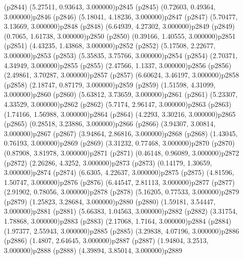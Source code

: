 \psdot(p2844)
\psPoint(5.27511, 0.93643, 3.000000){p2845}
\psdot(p2845)
\psPoint(0.72603, 0.49364, 3.000000){p2846}
\psdot(p2846)
\psPoint(5.18041, 4.18236, 3.000000){p2847}
\psdot(p2847)
\psPoint(5.70477, 3.13669, 3.000000){p2848}
\psdot(p2848)
\psPoint(6.64939, 4.27302, 3.000000){p2849}
\psdot(p2849)
\psPoint(0.7065, 1.61738, 3.000000){p2850}
\psdot(p2850)
\psPoint(0.39166, 1.40555, 3.000000){p2851}
\psdot(p2851)
\psPoint(4.43235, 1.43868, 3.000000){p2852}
\psdot(p2852)
\psPoint(5.17508, 2.22677, 3.000000){p2853}
\psdot(p2853)
\psPoint(5.35835, 3.75766, 3.000000){p2854}
\psdot(p2854)
\psPoint(2.70371, 4.34949, 3.000000){p2855}
\psdot(p2855)
\psPoint(2.47566, 1.1337, 3.000000){p2856}
\psdot(p2856)
\psPoint(2.49861, 3.70287, 3.000000){p2857}
\psdot(p2857)
\psPoint(6.60624, 3.46197, 3.000000){p2858}
\psdot(p2858)
\psPoint(2.18747, 0.87179, 3.000000){p2859}
\psdot(p2859)
\psPoint(1.51598, 4.31099, 3.000000){p2860}
\psdot(p2860)
\psPoint(5.63812, 3.73659, 3.000000){p2861}
\psdot(p2861)
\psPoint(5.23307, 4.33529, 3.000000){p2862}
\psdot(p2862)
\psPoint(5.7174, 2.96147, 3.000000){p2863}
\psdot(p2863)
\psPoint(1.74166, 1.56988, 3.000000){p2864}
\psdot(p2864)
\psPoint(4.2293, 3.30216, 3.000000){p2865}
\psdot(p2865)
\psPoint(0.28518, 3.23886, 3.000000){p2866}
\psdot(p2866)
\psPoint(3.94307, 3.00814, 3.000000){p2867}
\psdot(p2867)
\psPoint(3.94864, 2.86816, 3.000000){p2868}
\psdot(p2868)
\psPoint(1.43045, 0.76193, 3.000000){p2869}
\psdot(p2869)
\psPoint(3.31232, 0.77468, 3.000000){p2870}
\psdot(p2870)
\psPoint(0.87908, 3.81978, 3.000000){p2871}
\psdot(p2871)
\psPoint(0.46148, 0.96089, 3.000000){p2872}
\psdot(p2872)
\psPoint(2.26286, 4.3252, 3.000000){p2873}
\psdot(p2873)
\psPoint(0.14179, 1.30659, 3.000000){p2874}
\psdot(p2874)
\psPoint(6.6305, 4.22637, 3.000000){p2875}
\psdot(p2875)
\psPoint(4.81596, 1.50747, 3.000000){p2876}
\psdot(p2876)
\psPoint(6.44547, 2.81113, 3.000000){p2877}
\psdot(p2877)
\psPoint(2.91902, 0.78056, 3.000000){p2878}
\psdot(p2878)
\psPoint(5.16205, 0.77533, 3.000000){p2879}
\psdot(p2879)
\psPoint(1.25823, 3.28684, 3.000000){p2880}
\psdot(p2880)
\psPoint(1.59181, 3.54447, 3.000000){p2881}
\psdot(p2881)
\psPoint(5.66383, 1.04563, 3.000000){p2882}
\psdot(p2882)
\psPoint(3.31754, 1.78868, 3.000000){p2883}
\psdot(p2883)
\psPoint(2.17068, 1.7164, 3.000000){p2884}
\psdot(p2884)
\psPoint(1.97377, 2.55943, 3.000000){p2885}
\psdot(p2885)
\psPoint(3.29838, 4.07196, 3.000000){p2886}
\psdot(p2886)
\psPoint(1.4807, 2.64645, 3.000000){p2887}
\psdot(p2887)
\psPoint(1.94804, 3.2513, 3.000000){p2888}
\psdot(p2888)
\psPoint(4.39894, 3.85014, 3.000000){p2889}
